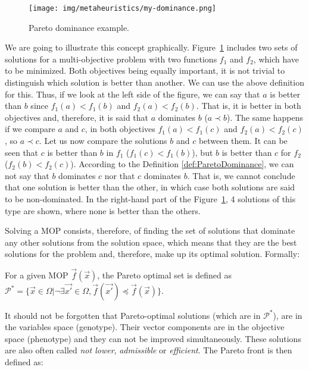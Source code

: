 \begin{figure}[H] %
	\centering 
	\texttt{[image: img/metaheuristics/my-dominance.png]}
	\caption{Pareto dominance example.} \label{fig:dominance}
\end{figure}


We are going to illustrate this concept graphically. Figure~\ref {fig:dominance} includes two sets of solutions for a multi-objective problem with two functions $f_1$ and $f_2$, which have to be minimized. Both objectives being equally important, it is not trivial to distinguish which solution is better than another. We can use the above definition for this. Thus, if we look at the left side of the figure, we can say that $a$ is better than $b$ since $f_1(a) < f_1(b)$ and $f_2(a) < f_2(b)$. That is, it is better in both objectives and, therefore, it is said that $a$ dominates $b$ ($a \prec b$). The same happens if we compare $a$ and $c$, in both objectives $f_1 (a) < f_1(c)$ and $f_2(a) < f_2(c)$, so $a \prec c$. Let us now compare the solutions $b$ and $c$ between them. It can be seen that $c$ is better than $b$ in $f_1$ ($f_1(c) < f_1(b)$), but $b$ is better than $c$ for $f_2$ ($f_2(b) < f_2 (c)$). According to the Definition \ref{def:ParetoDominance}, we can not say that $b$ dominates $c$ nor that $c$ dominates $b$. That is, we cannot conclude that one solution is better than the other, in which case both solutions are said to be non-dominated. In the right-hand part of the Figure~\ref{fig:dominance}, 4 solutions of this type are shown, where none is better than the others.

Solving a MOP consists, therefore, of finding the set of solutions that dominate any other solutions from the solution space, which means that they are the best solutions for the problem and, therefore, make up its optimal solution. Formally:

\begin{definition} \label{def:ParetoOptimalSet} For a given MOP $\vec{f}(\vec{x})$,
	the Pareto optimal set is defined as $\mathcal{P^*} = \{\vec{x} \in \Omega | \neg\exists\vec{x'} \in \Omega,
	\vec{f}(\vec{x'}) \preccurlyeq \vec{f}(\vec{x})\}$.
\end{definition}

It should not be forgotten that Pareto-optimal solutions (which  are in $\mathcal{P^*}$), are in the variables space (genotype). Their vector components are in the objective space (phenotype) and they can not be improved simultaneously. These solutions are also often called \emph{not lower}, \emph{admissible} or \emph{efficient}. The Pareto front is then defined as:

